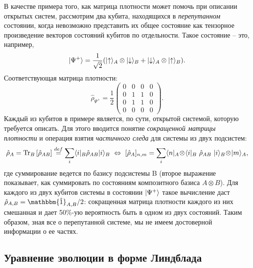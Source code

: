 \documentclass[12pt, twoside]{report}
\newcommand{\pTr}[2]{\text{Tr}_{#1}\left[#2\right]}
\DeclarePairedDelimiter\bra{\langle}{\rvert}
\DeclarePairedDelimiter\ket{\lvert}{\rangle}
\newcommand{\rbrkt}[1]{\left( #1 \right)}
\numberwithin{equation}{section}
\numberwithin{figure}{section}
\begin{document}
В качестве примера того, как матрица плотности может помочь при описании открытых систем, рассмотрим два кубита, находящихся в \textit{перепутанном} состоянии, когда невозможно представить их общее состояние как тензорное произведение векторов состояний кубитов по отдельности. Такое состояние -- это, например, 
\[
\ket{\Psi^+} = \frac{1}{\sqrt{2}}(\ket{\uparrow}_A\otimes\ket{\downarrow}_B+\ket{\downarrow}_A\otimes\ket{\uparrow}_B).
\]
Соответствующая матрица плотности:
\[ 
\hat \rho_{\Psi^+} = \frac{1}{2} \rbrkt{\begin{matrix}
0&0&0&0\\
0&1&1&0\\
0&1&1&0\\
0&0&0&0
\end{matrix} }.
\]
Каждый из кубитов в примере является, по сути, открытой системой, которую требуется описать. Для этого вводится понятие \textit{сокращенной матрицы плотности} и операция взятия \textit{частичного следа} для системы из двух подсистем:
\[
\hat \rho_A = \pTr{B}{\hat \rho_{AB}} \overset{def}{=} \sum_i \bra{i}_B \hat \rho_{AB} \ket{i}_B \ \Leftrightarrow \ [\hat \rho_A]_{n, m} = \sum_i \bra{n}_A \! \otimes\! \bra{i}_B\ \hat \rho_{AB}\ \ket{i}_B\!\otimes\! \ket{m}_A,
\] 
где суммирование ведется по базису подсистемы B (второе выражение показывает, как суммировать по состояниям композитного базиса $A\otimes B$). Для каждого из двух кубитов системы в состоянии $\ket{\Psi^+}$ такое вычисление даст $\hat \rho_{A,B} = \mathbbm{\hat 1}_{A, B}/2$: сокращенная матрица плотности каждого из них смешанная и дает 50\%-ую вероятность быть в одном из двух состояний. Таким образом, зная все о перепутанной системе, мы не имеем достоверной информации о ее частях.

\subsection{Уравнение эволюции в форме Линдблада}
\end{document}

